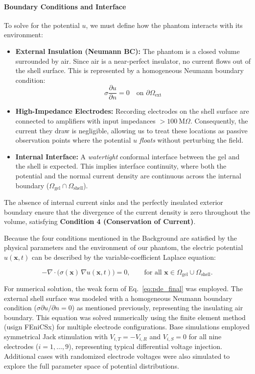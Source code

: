 \paragraph*{Boundary Conditions and Interface}
To solve for the potential $u$, we must define how the phantom interacts with its environment:

\begin{itemize}
    \item \textbf{External Insulation (Neumann BC): } The phantom is a closed volume surrounded by air. Since air is a near-perfect insulator, no current flows out of the shell surface. This is represented by a homogeneous Neumann boundary condition:
    $$ \sigma \frac{\partial u}{\partial n} = 0 \quad \text{on } \partial\Omega_{\text{ext}} $$
    
    \item \textbf{High-Impedance Electrodes: }Recording electrodes on the shell surface are connected to amplifiers with input impedances $>100~\text{M}\Omega$. Consequently, the current they draw is negligible, allowing us to treat these locations as passive observation points where the potential $u$ \textit{floats} without perturbing the field.

    \item \textbf{Internal Interface: }A \textit{watertight} conformal interface between the gel and the shell is expected. This implies interface continuity, where both the potential and the normal current density are continuous across the internal boundary ($\Omega_{\text{gel}} \cap \Omega_{\text{shell}}$).
\end{itemize}

The absence of internal current sinks and the perfectly insulated exterior boundary ensure that the divergence of the current density is zero throughout the volume, satisfying \textbf{Condition 4 (Conservation of Current)}.

Because the four conditions mentioned in the Background are satisfied by the physical parameters and the environment of our phantom, the electric potential $u(\mathbf{x}, t)$ can be described by the variable-coefficient Laplace equation:

\begin{equation}
-\nabla \cdot \big(\sigma(\mathbf{x})\, \nabla u(\mathbf{x},t)\big) = 0, \qquad \text{for all } \mathbf{x} \in \Omega_{\text{gel}} \cup \Omega_{\text{shell}}.
\label{eq:pde_final}
\end{equation}

For numerical solution, the weak form of Eq.~\eqref{eq:pde_final} was employed.
The external shell surface was modeled with a homogeneous Neumann boundary 
condition ($\sigma \partial u/\partial n = 0$) as mentioned previously, 
representing the insulating air boundary. This equation was solved numerically 
using the finite element method (usign FEniCSx) for multiple electrode configurations. 
Base simulations employed symmetrical Jack stimulation with $V_{i,T} = -V_{i,R}$ 
and $V_{i,S} = 0$ for all nine electrodes ($i = 1,\ldots,9$), representing typical 
differential voltage injection. Additional cases with randomized electrode voltages 
were also simulated to explore the full parameter space of potential distributions.